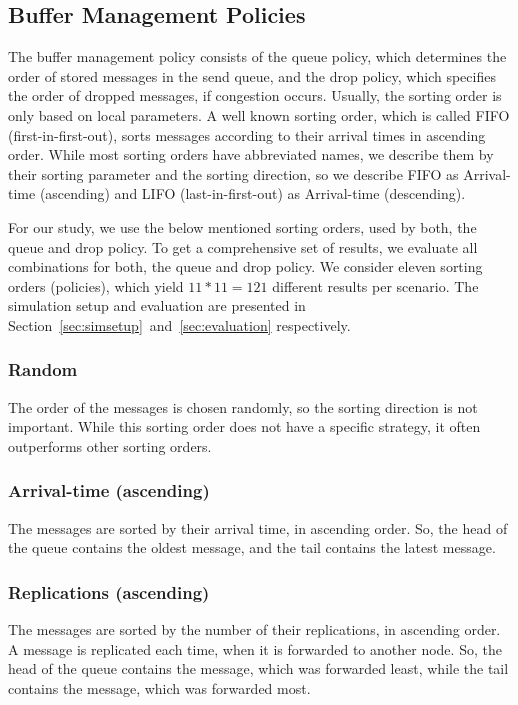 \documentclass[conference,10pt,letterpaper,final]{IEEEtran}
\begin{document}

\subsection{Buffer Management Policies}
\label{subsec:bufferpolicies}

The buffer management policy consists of the queue policy, which determines the order of stored messages in the send queue, and the drop policy, which specifies the order of dropped messages, if congestion occurs. 
Usually, the sorting order is only based on local parameters.
A well known sorting order, which is called FIFO (first-in-first-out), sorts messages according to their arrival times in ascending order.
While most sorting orders have abbreviated names, we describe them by their sorting parameter and the sorting direction, so we describe FIFO as Arrival-time (ascending) and LIFO (last-in-first-out) as Arrival-time (descending).

For our study, we use the below mentioned sorting orders, used by both, the queue and drop policy.
To get a comprehensive set of results, we evaluate all combinations for both, the queue and drop policy.
We consider eleven sorting orders (policies), which yield $11 * 11 = 121$ different results per scenario.
The simulation setup and evaluation are presented in Section~\ref{sec:simsetup}~and~\ref{sec:evaluation} respectively.

\vspace{0.2cm}
\subsubsection{Random}
The order of the messages is chosen randomly, so the sorting direction is not important.
While this sorting order does not have a specific strategy, it often outperforms other sorting orders.

\vspace{0.2cm}
\subsubsection{Arrival-time (ascending)}
The messages are sorted by their arrival time, in ascending order.
So, the head of the queue contains the oldest message, and the tail contains the latest message.

\vspace{0.2cm}
\subsubsection{Replications (ascending)}
The messages are sorted by the number of their replications, in ascending order.
A message is replicated each time, when it is forwarded to another node.
So, the head of the queue contains the message, which was forwarded least, while the tail contains the message, which was forwarded most.
\end{document}
